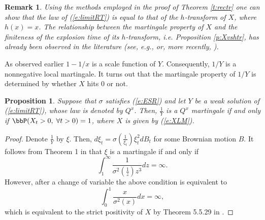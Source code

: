 \documentclass[11pt,reqno]{amsart}
\numberwithin{equation}{section}
\newtheorem{proposition}{Proposition}[section]
\newtheorem{remark}{Remark}[section]
\def\rar{\rightarrow}
\begin{document}
\begin{remark} \label{r:Yashtr} Using the methods employed in the proof of Theorem \ref{t:rectr} one can show that the law of (\ref{e:limitRT}) is equal to that of the $h$-transform of $X$, where $h(x)=x$. The relationship between the martingale property of $X$ and the finiteness of the explosion time of its $h$-transform, i.e. Proposition \ref{p:Xvshtr}, has already been observed in the literature (see, e.g., \cite{F72} or, more recently, \cite{KKN}). 
\end{remark}
As observed earlier $1-1/x$ is a scale function of $Y$. Consequently, $1/Y$ is a nonnegative local martingale. It turns out that the martingale property of $1/Y$ is determined by whether $X$ hits $0$ or not.
\begin{proposition}\label{p:Yinvmart}
Suppose that $\sigma$ satisfies (\ref{e:ESR}) and let  $Y$ be a weak solution of  (\ref{e:limitRT}), whose law is denoted by $Q^x$. Then, $\frac{1}{Y}$ is a $Q^x$ martingale if and only if $\bbP(X_t>0,\; \forall t>0)=1$, where $X$ is given by (\ref{e:XLM}). 
\end{proposition}
\begin{proof}
	Denote $\frac{1}{Y}$ by $\xi$. Then, $d\xi_t=\sigma(\frac{1}{\xi_t})\xi^2_tdB_t$	for some Brownian motion $B$. It follows from Theorem 1 in \cite{Kotani} that  $\xi$ is a martingale if and only if
	\[
	\int_1^{\infty}\frac{1}{\sigma^2(\frac{1}{z})z^3}dz=\infty.
	\]
	However, after a change of variable the above condition is equivalent to
	\[
	\int_0^1\frac{x}{\sigma^2(x)}dx=\infty,
	\]
	which is equivalent to the strict positivity of $X$ by Theorem 5.5.29 in \cite{KS}.
	\end{proof}
\end{document}
